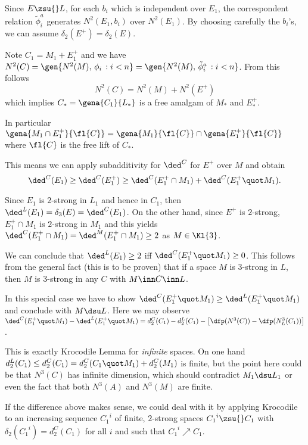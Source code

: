 \medskip
Since $E\zsu{} L$,  for each $b_{i}$ which is independent over $E_{1}$,
the correspondent relation $\tilde\phi ^{a}_{i}$ generates $N^{2}(E_{1},b_{i})$ over
$N^{2}(E_{1})$. By choosing carefully the $b_{i}$'s, we can assume $\delta_{2}(E^{+})=
\delta_{2}(E)$.

\medskip
Note $C_{1}=M_{1}+E_{1}^{+}$ and we have $N^{2}(C)=\gen{N^{2}(M),\,\phi_{i}\,:i<n}=\gen{N^{2}(M),\,\tilde\phi ^{a}_{i}\,:i<n}$. From this follows
$$N^{2}(C)=N^{2}(M)+N^{2}(E^{+})$$
which implies $C_{*}=\gena{C_{1}}{L_{*}}$ is a free amalgam of $M_{*}$ and $E^{+}_{*}$.

In particular
$\gena{M_{1}\cap E_{1}^{+}}{\fl{C}}=\gena{M_{1}}{\fl{C}}\cap\gena{E_{1}^{+}}{\fl{C}}$
where $\fl{C}$ is the free lift of $C_{*}$.

\medskip
This means we can apply subadditivity for $\ded^{C}$ for $E^{+}$ over $M$
and obtain
$$\ded^{C}(E_{1})\geq\ded^{C}(E_{1}^{+})\geq\ded^{C}(E_{1}^{+}\cap M_{1})+\ded^{C}(E_{1}^{+}\quot M_{1}).$$

Since $E_{1}$ is $2$-strong in $L_{1}$ and hence in $C_{1}$, then $\ded^{L}(E_{1})=\delta_{3}(E)=\ded^{C}(E_{1})$. On the other hand, since $E^{+}$ is $2$-strong, $E_{1}^{+}\cap M_{1}$ is $2$-strong in $M_{1}$ and this yields $\ded^{C}(E_{1}^{+}\cap M_{1})=\ded^{M}(E_{1}^{+}\cap M_{1})\geq2$ as $M\in\Kl{3}$.

\medskip
We can conclude that $\ded^{L}(E_{1})\geq2$ iff $\ded^{C}(E_{1}^{+}\quot M_{1})\geq0$.
This follows from the general fact (this is to be proven) that if a space $M$ is $3$-strong
in $L$, then $M$ is $3$-strong in any $C$ with $M\inn C\inn L$.

In this special case we have to show $\ded^{C}(E_{1}^{+}\quot M_{1})\geq\ded^{L}(E_{1}^{+}\quot M_{1})$ and conclude with $M\dsu L$. Here we may observe
$\ded^{C}(E_{1}^{+}\quot M_{1})-\ded^{L}(E_{1}^{+}\quot M_{1})=
d_{2}^{C}(C_{1})-d_{2}^{L}(C_{1})-\left[  \dfp(N^{3}(C))-\dfp(N^{3}_{L}(C_{1}))  \right]$.

This is exactly  Krocodile Lemma for {\em infinite} spaces. On one hand 
$d_{2}^{L}(C_{1})\leq d_{2}^{C}(C_{1})=d_{2}^{C}(C_{1}\quot M_{1})+d_{2}^{C}(M_{1})$
is finite, but the point here could be that $N^{3}(C)$ has infinite dimension, which
should contradict $M_{1}\dsu L_{1}$ or even the fact that both $N^{3}(A)$ and $N^{3}(M)$
are finite.

If the difference above makes sense, we could deal with it by applying
Krocodile to an increasing sequence ${C_{1}}^{i}$ of finite, $2$-strong spaces ${C_{1}}^{i}\zsu{} C_{1}$ with $\delta_{2}({C_{1}}^{i})=d_{2}^{C}(C_{1})$ for all $i$ and such that ${C_{1}}^{i}\nearrow C_{1}$.

